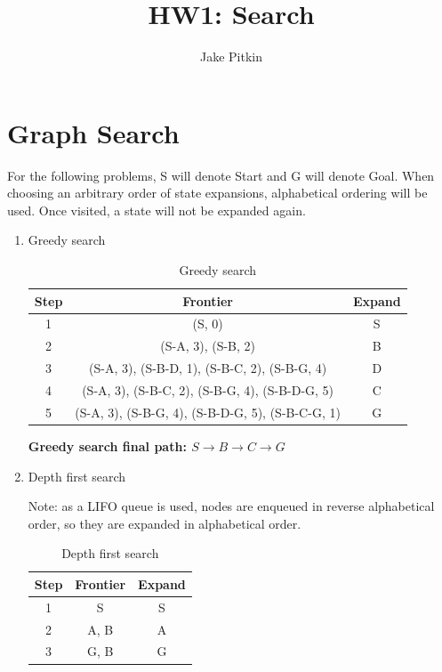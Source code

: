 \documentclass[fleqn]{hermans-hw}
\title{HW1: Search}
\institute{University of Utah}
\author{Jake Pitkin}
\begin{document}
\maketitle
\section{Graph Search}

For the following problems, S will denote Start and G will denote Goal. When choosing an arbitrary order of state expansions, alphabetical ordering will be used. Once visited, a state will not be expanded again.

\begin{enumerate}
\item Greedy search

\begin{table}[H]
\centering
{\renewcommand{\arraystretch}{1.2}%
\begin{tabular}{| c | c | c |}
\hline
\textbf{Step} & \textbf{Frontier} & \textbf{Expand}\\
\hline
1 & (S, 0) & S\\ \hline
2 & (S-A, 3), (S-B, 2) & B\\ \hline
3 & (S-A, 3), (S-B-D, 1), (S-B-C, 2), (S-B-G, 4) & D\\ \hline
4 & (S-A, 3), (S-B-C, 2), (S-B-G, 4), (S-B-D-G, 5) & C\\ \hline
5 & (S-A, 3), (S-B-G, 4), (S-B-D-G, 5), (S-B-C-G, 1) & G\\ \hline
\end{tabular}}
\caption{Greedy search}
\end{table}

\textbf{Greedy search final path: $S \rightarrow B \rightarrow C \rightarrow G$}

\item Depth first search
 
Note: as a LIFO queue is used, nodes are enqueued in reverse alphabetical order, so they are expanded in alphabetical order.

\begin{table}[H]
\centering
{\renewcommand{\arraystretch}{1.2}%
\begin{tabular}{| c | c | c |}
\hline
\textbf{Step} & \textbf{Frontier} & \textbf{Expand}\\
\hline
1 & S & S\\ \hline
2 & A, B & A\\ \hline
3 & G, B & G\\ \hline
\end{tabular}}
\caption{Depth first search}
\end{table}


\end{enumerate}
\end{document}
